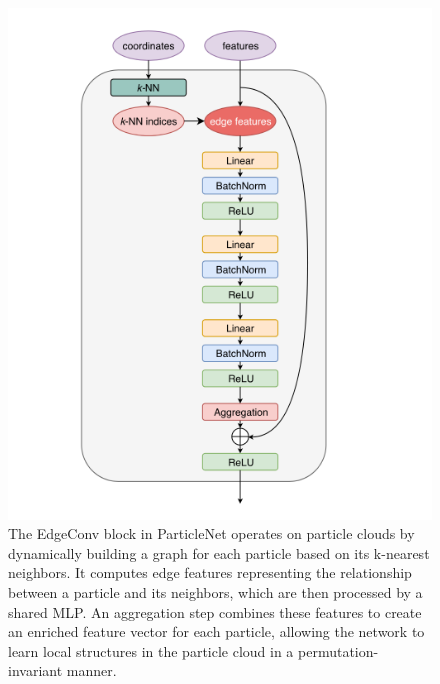 \documentclass[letterpaper,12pt]{article}
\begin{document}
\begin{spacing}{1.125}
\begin{figure}[H]
    \centering
    \begin{minipage}{0.48\textwidth}
        \centering
        \includegraphics[width=\textwidth]{edge_conv.png}
        \caption[Architecture of ParticleNet]{The EdgeConv block in ParticleNet operates on particle clouds by dynamically building a graph for each particle based on its k-nearest neighbors. It computes edge features representing the relationship between a particle and its neighbors, which are then processed by a shared MLP. An aggregation step combines these features to create an enriched feature vector for each particle, allowing the network to learn local structures in the particle cloud in a permutation-invariant manner.}
    \end{minipage}
    \hfill
    \begin{minipage}{0.48\textwidth}
        \centering

\end{minipage}
\end{figure}
\end{spacing}
\end{document}
